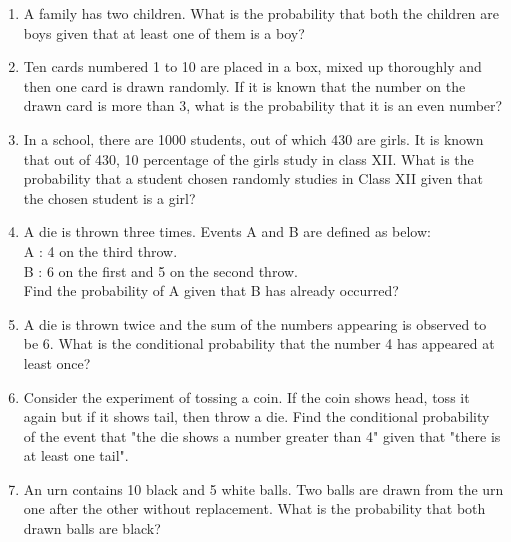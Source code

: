 \begin{enumerate}[label=\thesection.\arabic*.,ref=\thesection.\theenumi]
\item A family has two children. What is the probability that both the children are boys given that at least one of them is a boy?\\
%
\solution

\item Ten cards numbered 1 to 10 are placed in a box, mixed up thoroughly and then one card is drawn randomly. If it is known that the number on the drawn card is more than 3, what is the probability that it is an even number?\\
\solution


\item In a school, there are 1000 students, out of which 430 are girls. It is known that out of 430,  10 percentage of the girls study in class XII. What is the probability that a student chosen randomly studies in Class XII given that the chosen student is a girl?\\
\solution


\item A die is thrown three times. Events A and B are defined as below:\\
A : 4 on the third throw.\\
B : 6 on the first and 5 on the second throw.\\
Find the probability of A given that B has already occurred?\\
\solution


\item A die is thrown twice and the sum of the numbers appearing is observed to be 6. What is the conditional probability that the number 4 has appeared at least once?\\
\solution


\item Consider the experiment of tossing a coin. If the coin shows head, toss it again but if it shows tail, then throw a die. Find the conditional probability of the event that "the die shows a number greater than 4" given that "there is at least one tail".\\
\solution


\item An urn contains 10 black and 5 white balls. Two balls are drawn from the urn one after the other without replacement. What is the probability that both drawn balls are black?\\


\end{enumerate}
